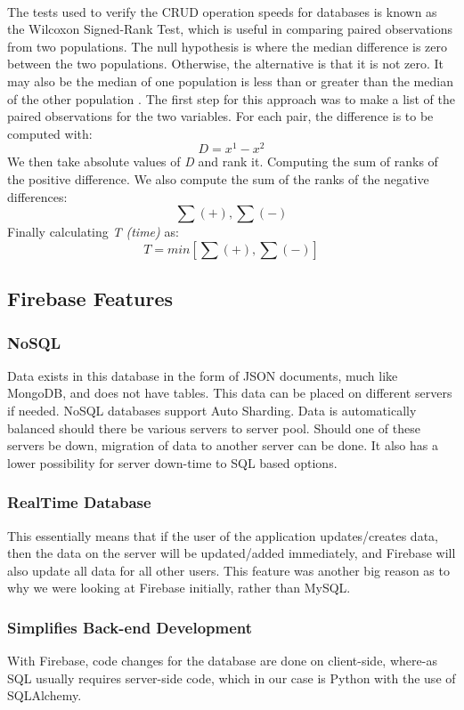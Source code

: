 \\ The tests used to verify the CRUD operation speeds for databases is known as the Wilcoxon Signed-Rank Test, which is useful in comparing paired observations from two populations. The null hypothesis is where the median difference is zero between the two populations. Otherwise, the alternative is that it is not zero. It may also be the median of one population is less than or greater than the median of the other population \cite{OHYVER2019396}. The first step for this approach was to make a list of the paired observations for the two variables. For each pair, the difference is to be computed with: \[ D = x^1 - x^2 \]
We then take absolute values of \textit{D} and rank it. Computing the sum of ranks of the positive difference. We also compute the sum of the ranks of the negative differences: \[\sum{(+)},\sum{(-)}\]
Finally calculating \textit{T (time)} as: \[T = min[\sum{(+)},\sum{(-)}]\] 
\subsection{Firebase Features}
\subsubsection{NoSQL}
Data exists in this database in the form of JSON documents, much like MongoDB, and does not have tables. This data can be placed on different servers if needed. NoSQL databases support Auto Sharding. Data is automatically balanced should there be various servers to server pool. Should one of these servers be down, migration of data to another server can be done. It also has a lower possibility for server down-time to SQL based options.
\subsubsection{RealTime Database}
This essentially means that if the user of the application updates/creates data, then the data on the server will be updated/added immediately, and Firebase will also update all data for all other users. This feature was another big reason as to why we were looking at Firebase initially, rather than MySQL.
\subsubsection{Simplifies Back-end Development}
With Firebase, code changes for the database are done on client-side, where-as SQL usually requires server-side code, which in our case is Python with the use of SQLAlchemy.

